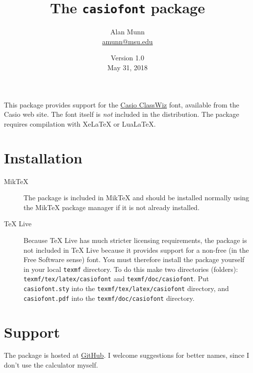 \documentclass[12pt]{article}
\title{The \texttt{casiofont} package}
\author{Alan Munn\\\url{amunn@msu.edu}}
\date{Version 1.0\\May 31, 2018}
\begin{document}
\maketitle
This package provides support for the \href{https://edu.casio.com/forteachers/er/fontsets/index.php}{Casio ClassWiz} font, available from the Casio web site.  The font itself is \emph{not} included in the distribution.
The package requires compilation with XeLaTeX or LuaLaTeX.
\section*{Installation}
\begin{description}
\item[MikTeX]{The package is included in MikTeX and should be installed normally using the MikTeX package manager if it is not already installed.}
\item[TeX Live]{Because TeX Live has much stricter licensing requirements, the package is not included in TeX Live because it provides support for a non-free (in the Free Software sense) font. You must therefore install the package yourself in your local \texttt{texmf} directory.  To do this make two directories (folders): \texttt{texmf/tex/latex/casiofont} and \texttt{texmf/doc/casiofont}. Put \texttt{casiofont.sty} into the \texttt{texmf/tex/latex/casiofont} directory, and \texttt{casiofont.pdf} into the \texttt{texmf/doc/casiofont} directory.}
\end{description}
\section*{Support}
The package is hosted at \href{https://github.com/amunn/casiofont}{GitHub}. I welcome suggestions for better names, since I don't use the calculator myself. 
\clearpage
\end{document}
